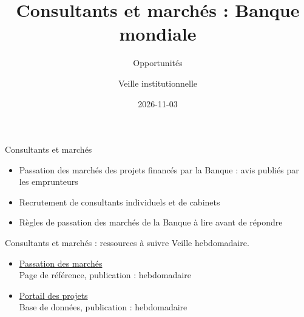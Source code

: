 \documentclass[aspectratio=169,11pt]{beamer}
\title{Consultants et marchés : Banque mondiale}
\subtitle{Opportunités}
\author{Veille institutionnelle}
\date{2026-11-03}
\begin{document}
\begin{frame}\titlepage\end{frame}

\begin{frame}{Consultants et marchés}
\begin{itemize}
\item Passation des marchés des projets financés par la Banque : avis publiés par les emprunteurs
\item Recrutement de consultants individuels et de cabinets
\item Règles de passation des marchés de la Banque à lire avant de répondre
\end{itemize}
\end{frame}

\begin{frame}{Consultants et marchés : ressources à suivre}
\small
Veille hebdomadaire.
\begin{itemize}
\item \href{https://www.worldbank.org/en/projects-operations/procurement}{Passation des marchés}\\{\footnotesize Page de référence, publication : hebdomadaire}
\item \href{https://projects.worldbank.org}{Portail des projets}\\{\footnotesize Base de données, publication : hebdomadaire}
\end{itemize}
\end{frame}
\end{document}
